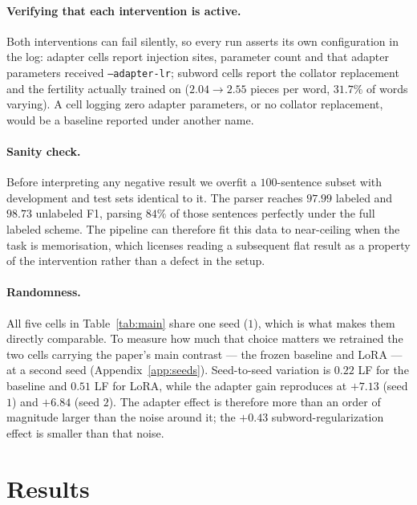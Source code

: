 \documentclass[11pt]{article}
\begin{document}
\paragraph{Verifying that each intervention is active.} Both interventions can
fail silently, so every run asserts its own configuration in the log: adapter
cells report injection sites, parameter count and that adapter parameters
received \texttt{--adapter-lr}; subword cells report the collator replacement and
the fertility actually trained on ($2.04 \rightarrow 2.55$ pieces per word,
$31.7\%$ of words varying). A cell logging zero adapter parameters, or no
collator replacement, would be a baseline reported under another name.

\paragraph{Sanity check.} Before interpreting any negative result we overfit a
$100$-sentence subset with development and test sets identical to it. The parser
reaches $97.99$ labeled and $98.73$ unlabeled F1, parsing $84\%$ of those
sentences perfectly under the full labeled scheme. The pipeline can therefore fit
this data to near-ceiling when the task is memorisation, which licenses reading a
subsequent flat result as a property of the intervention rather than a defect in
the setup.

\paragraph{Randomness.} All five cells in Table~\ref{tab:main} share one seed
($1$), which is what makes them directly comparable. To measure how much that
choice matters we retrained the two cells carrying the paper's main contrast ---
the frozen baseline and LoRA --- at a second seed (Appendix~\ref{app:seeds}).
Seed-to-seed variation is $0.22$ LF for the baseline and $0.51$ LF for LoRA,
while the adapter gain reproduces at $+7.13$ (seed $1$) and $+6.84$ (seed $2$).
The adapter effect is therefore more than an order of magnitude larger than the
noise around it; the $+0.43$ subword-regularization effect is smaller than that
noise.

\section{Results}
\end{document}
